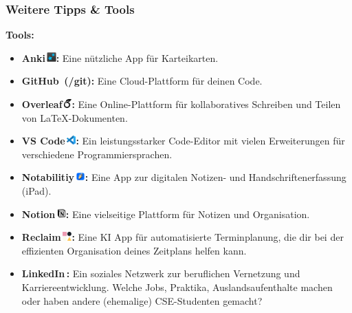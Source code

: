 \documentclass[10pt,a4paper]{beamer}
\begin{document}
    \begin{frame}
        \frametitle{Weitere Tipps \& Tools}
        \vfill
        \textbf{Tools:}
        \vfill
        \begin{itemize}
            \item \textbf{Anki\,\includegraphics[height=10pt]{bilder/anki.png}:} Eine nützliche App für Karteikarten.
            \vfill
            \item \textbf{GitHub\, (/git):} Eine Cloud-Plattform für deinen Code.
            \vfill
            \item \textbf{Overleaf\,\includegraphics[height=10pt]{bilder/overleaf.png}:} Eine Online-Plattform für kollaboratives Schreiben und Teilen von LaTeX-Dokumenten.
            \vfill
            \item \textbf{VS Code\,\includegraphics[height=10pt]{bilder/vs-code.png}:} Ein leistungsstarker Code-Editor mit vielen Erweiterungen für verschiedene Programmiersprachen.
            \vfill
            \item \textbf{Notabilitiy\,\includegraphics[height=10pt]{bilder/notability.png}:} Eine App zur digitalen Notizen- und Handschriftenerfassung (iPad).
            \vfill
            \item \textbf{Notion\,\includegraphics[height=10pt]{bilder/notion.png}:} Eine vielseitige Plattform für Notizen und Organisation.
            \vfill
            \item \textbf{Reclaim\,\includegraphics[height=10pt]{bilder/reclaim.png}:} Eine KI App für automatisierte Terminplanung, die dir bei der effizienten Organisation deines Zeitplans helfen kann.
            \vfill
            \item \textbf{LinkedIn\,:} Ein soziales Netzwerk zur beruflichen Vernetzung und Karriereentwicklung. Welche Jobs, Praktika, Auslandsaufenthalte machen oder haben andere (ehemalige) CSE-Studenten gemacht?
        \end{itemize}
        \vfill
    \end{frame}
\end{document}
